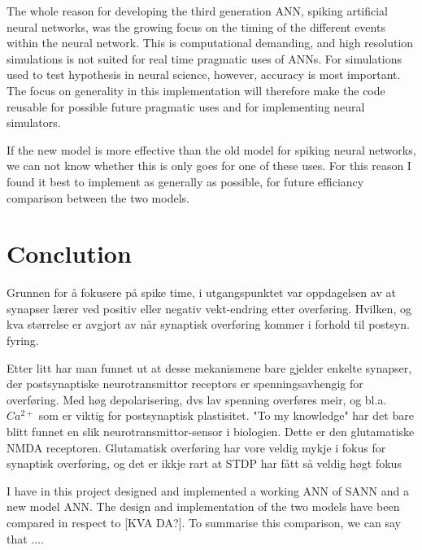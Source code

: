 The whole reason for developing the third generation ANN, spiking artificial neural networks, was the growing focus on the timing of the different events within the neural network.
This is computational demanding, and high resolution simulations is not suited for real time pragmatic uses of ANNs. For simulations used to test hypothesis in neural science, however, accuracy is most important.
The focus on generality in this implementation will therefore make the code reusable for possible future pragmatic uses and for implementing neural simulators.

If the new model is more effective than the old model for spiking neural networks, we can not know whether this is only goes for one of these uses. 
For this reason I found it best to implement as generally as possible, for future efficiancy comparison between the two models.



\section{Conclution}
Grunnen for å fokusere på spike time, i utgangspunktet var oppdagelsen av at synapser lærer ved positiv eller negativ vekt-endring etter overføring. 
Hvilken, og kva størrelse er avgjort av når synaptisk overføring kommer i forhold til postsyn. fyring.

Etter litt har man funnet ut at desse mekanismene bare gjelder enkelte synapser, der postsynaptiske neurotransmittor receptors er spenningsavhengig for overføring. 
Med høg depolarisering, dvs lav spenning overføres meir, og bl.a. $Ca^{2+}$ som er viktig for postsynaptisk plastisitet.
"To my knowledge" har det bare blitt funnet en slik neurotransmittor-sensor i biologien. Dette er den glutamatiske NMDA receptoren.
Glutamatisk overføring har vore veldig mykje i fokus for synaptisk overføring, og det er ikkje rart at STDP har fått så veldig høgt fokus %


I have in this project designed and implemented a working ANN of SANN and a new model ANN.
The design and implementation of the two models have been compared in respect to [KVA DA?].
To summarise this comparison, we can say that ....

